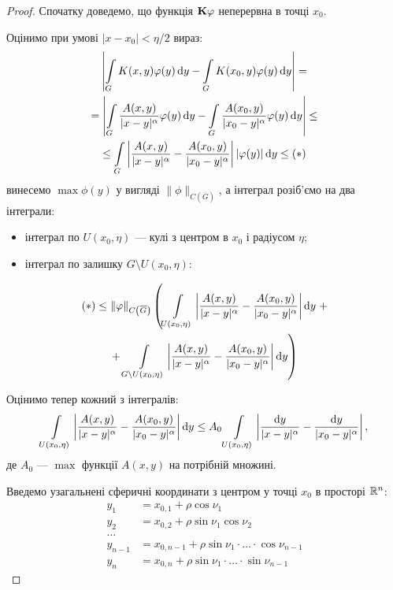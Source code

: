 \begin{proof}
	Спочатку доведемо, що функція $\bf{K}\phi$ неперервна в точці $x_0$. \medskip

	Оцінимо при умові $|x - x_0| < \eta / 2$ вираз:
	\begin{multline}
		\left| \Int_G K(x, y) \phi(y) \diff y - \Int_G K(x_0, y) \phi(y) \diff y \right| = \\
		= \left| \Int_G \dfrac{A(x, y)}{|x - y|^\alpha} \phi(y) \diff y - \Int_G \dfrac{A(x_0, y)}{|x_0 - y|^\alpha} \phi(y) \diff y \right| \le \\
		\le \Int_G \left|\dfrac{A(x, y)}{|x - y|^\alpha} - \dfrac{A(x_0, y)}{|x_0 - y|^\alpha}\right| |\phi(y)| \diff y \le (*)
	\end{multline}
	винесемо $\max \phi(y)$ у вигляді $\|\phi\|_{C\left(\overline G\right)}$, а інтеграл розіб'ємо на два інтеграли: 
	\begin{itemize}
		\item інтеграл по $U(x_0, \eta)$ --- кулі з центром в $x_0$ і радіусом $\eta$; 
		\item інтеграл по залишку $G \setminus U(x_0, \eta)$:
	\end{itemize}%
	\begin{multline} 
		(*) \le \|\phi\|_{C\left(\overline G\right)} \left( \Int_{U(x_0, \eta)} \left|\dfrac{A(x, y)}{|x - y|^\alpha} - \dfrac{A(x_0, y)}{|x_0 - y|^\alpha}\right| \diff y\right. + \\
		+ \left.\Int_{G \setminus U(x_0, \eta)} \left|\dfrac{A(x, y)}{|x - y|^\alpha} - \dfrac{A(x_0, y)}{|x_0 - y|^\alpha}\right| \diff y\right)
	\end{multline}
	
	Оцінимо тепер кожний з інтегралів:
	\begin{equation}
		\Int_{U(x_0, \eta)} \left|\dfrac{A(x, y)}{|x - y|^\alpha} - \dfrac{A(x_0, y)}{|x_0 - y|^\alpha}\right| \diff y \le A_0 \Int_{U(x_0, \eta)} \left|\dfrac{\diff y}{|x - y|^\alpha} - \dfrac{\diff y}{|x_0 - y|^\alpha}\right|,
	\end{equation}
	де $A_0$ --- $\max$ функції $A(x, y)$ на потрібній множині. \medskip

	Введемо узагальнені сферичні координати з центром у точці $x_0$ в просторі $\RR^n$:
	\begin{equation}
		\begin{aligned} 
			y_1 &= x_{0, 1} + \rho \cos \nu_1 \\
			y_2 &= x_{0, 2} + \rho \sin \nu_1 \cos \nu_2 \\
			\ldots \\
			y_{n - 1} &= x_{0, n - 1} + \rho \sin \nu_1 \cdot \ldots \cdot \cos \nu_{n - 1} \\
			y_n &= x_{0, n} + \rho \sin \nu_1 \cdot \ldots \cdot \sin \nu_{n - 1}
		\end{aligned}
	\end{equation}


\end{proof}
